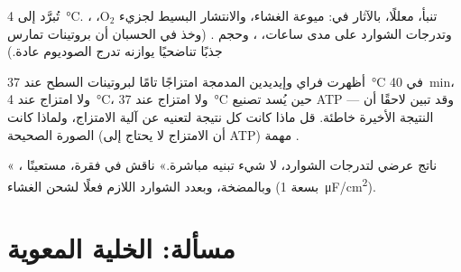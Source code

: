 \begin{exercise}[$\star\star\star$]\label{exo:b1:membranes-transport:10}
تُبرَّد  إلى \qty{4}{\celsius}. تنبأ، معللًا، بالآثار في: ميوعة
الغشاء، والانتشار البسيط لجزيء $\mathrm{O_2}$، ، وتدرجات الشوارد
على مدى ساعات، ، وحجم . (وخذ في الحسبان أن
بروتينات  تمارس جذبًا تناضحيًا يوازنه تدرج الصوديوم عادة.)
\end{exercise}

\begin{exercise}[$\star\star\star$]\label{exo:b1:membranes-transport:11}
أظهرت  فراي وإيديدين المدمجة امتزاجًا تامًا لبروتينات السطح عند
\qty{37}{\celsius} في \qty{40}{min}، ولا امتزاج عند
\qty{4}{\celsius}، ولا امتزاج عند \qty{37}{\celsius} حين يُسد تصنيع
ATP --- وقد تبين لاحقًا أن النتيجة الأخيرة خاطئة. قل ماذا كانت كل
نتيجة لتعنيه عن آلية الامتزاج، ولماذا كانت الصورة الصحيحة (أن
الامتزاج لا يحتاج إلى ATP) مهمة .
\end{exercise}

\begin{exercise}[$\star\star\star$]\label{exo:b1:membranes-transport:12}
« ناتج عرضي لتدرجات الشوارد، لا شيء تبنيه 
مباشرة.» ناقش في فقرة، مستعينًا ، وبالمضخة، وبعدد
الشوارد اللازم فعلًا لشحن الغشاء (بسعة \qty{1}{\micro F/cm^2}).
\end{exercise}

\section{مسألة: الخلية المعوية}

